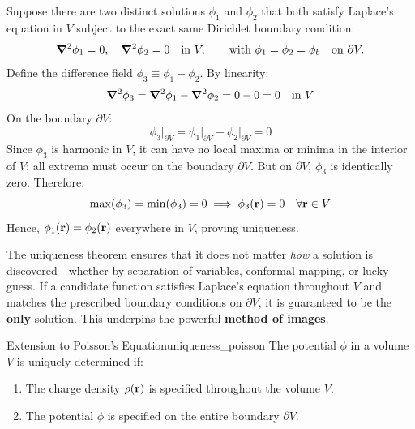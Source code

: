 \begin{proofbox}
Suppose there are two distinct solutions $\phi_1$ and $\phi_2$ that both satisfy Laplace's equation in $V$ subject to the exact same Dirichlet boundary condition:
\begin{equation}
    \grad^2\phi_1 = 0, \quad \grad^2\phi_2 = 0 \quad \text{in } V, \qquad \text{with } \phi_1 = \phi_2 = \phi_b \quad \text{on } \partial V.
\end{equation}
Define the difference field $\phi_3 \equiv \phi_1 - \phi_2$. By linearity:
\begin{equation}
    \grad^2\phi_3 = \grad^2\phi_1 - \grad^2\phi_2 = 0 - 0 = 0 \quad \text{in } V
\end{equation}
On the boundary $\partial V$:
\begin{equation}
    \phi_3\big|_{\partial V} = \phi_1\big|_{\partial V} - \phi_2\big|_{\partial V} = 0
\end{equation}
Since $\phi_3$ is harmonic in $V$, it can have no local maxima or minima in the interior of $V$; all extrema must occur on the boundary $\partial V$. But on $\partial V$, $\phi_3$ is identically zero. Therefore:
\begin{equation}
    \max(\phi_3) = \min(\phi_3) = 0 \implies \phi_3(\vb{r}) = 0 \quad \forall \vb{r} \in V
\end{equation}
Hence, $\phi_1(\vb{r}) = \phi_2(\vb{r})$ everywhere in $V$, proving uniqueness.
\end{proofbox}

\begin{remark}
The uniqueness theorem ensures that it does not matter \emph{how} a solution is discovered—whether by separation of variables, conformal mapping, or lucky guess. If a candidate function satisfies Laplace's equation throughout $V$ and matches the prescribed boundary conditions on $\partial V$, it is guaranteed to be the \textbf{only} solution. This underpins the powerful \textbf{method of images}.
\end{remark}

\begin{proposition}{Extension to Poisson's Equation}{uniqueness_poisson}
The potential $\phi$ in a volume $V$ is uniquely determined if:
\begin{enumerate}
    \item The charge density $\rho(\vb{r})$ is specified throughout the volume $V$.
    \item The potential $\phi$ is specified on the entire boundary $\partial V$.
\end{enumerate}
\end{proposition}

